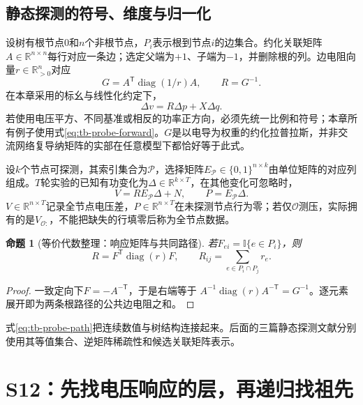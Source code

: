 \documentclass[UTF8,11pt,fontset=fandol,openany,oneside]{ctexbook}
\newtheorem{proposition}[theorem]{命题}
\theoremstyle{definition}
\theoremstyle{remark}
\numberwithin{equation}{chapter}
\begin{document}
\subsection{静态探测的符号、维度与归一化}

设树有根节点0和$n$个非根节点，$P_i$表示根到节点$i$的边集合。约化关联矩阵$A\in\mathbb R^{n\times n}$每行对应一条边；选定父端为$+1$、子端为$-1$，并删除根的列。边电阻向量$r\in\mathbb R^n_{>0}$对应
\[
 G=A^{\mathsf T}\operatorname{diag}(1/r)A,\qquad R=G^{-1}.
\]
在本章采用的标幺与线性化约定下，
\begin{equation}
 \Delta v=R\Delta p+X\Delta q.
 \label{eq:tb-probe-forward}
\end{equation}
若使用电压平方、不同基准或相反的功率正方向，必须先统一比例和符号；本章所有例子使用式\eqref{eq:tb-probe-forward}。$G$是以电导为权重的约化拉普拉斯，并非交流网络复导纳矩阵的实部在任意模型下都恰好等于此式。

设$k$个节点可探测，其索引集合为$\mathcal P$，选择矩阵$E_{\mathcal P}\in\{0,1\}^{n\times k}$由单位矩阵的对应列组成。$T$轮实验的已知有功变化为$\Delta\in\mathbb R^{k\times T}$，在其他变化可忽略时，
\begin{equation}
 V=RE_{\mathcal P}\Delta+N,\qquad P=E_{\mathcal P}\Delta.
 \label{eq:tb-probe-data}
\end{equation}
$V\in\mathbb R^{n\times T}$记录全节点电压差，$P\in\mathbb R^{n\times T}$在未探测节点行为零；若仅$\mathcal O$测压，实际拥有的是$V_{\mathcal O:}$，不能把缺失的行填零后称为全节点数据。

\begin{proposition}[等价代数整理：响应矩阵与共同路径]
若$F_{ei}=\mathbb I\{e\in P_i\}$，则
\begin{equation}
 R=F^{\mathsf T}\operatorname{diag}(r)F,\qquad
 R_{ij}=\sum_{e\in P_i\cap P_j}r_e.
 \label{eq:tb-probe-path}
\end{equation}
\end{proposition}
\begin{proof}
一致定向下$F=-A^{-\mathsf T}$，于是右端等于
$A^{-1}\operatorname{diag}(r)A^{-\mathsf T}=G^{-1}$。逐元素展开即为两条根路径的公共边电阻之和。
\end{proof}
式\eqref{eq:tb-probe-path}把连续数值与树结构连接起来。后面的三篇静态探测文献分别使用其等值集合、逆矩阵稀疏性和候选关联矩阵表示。

\section{S12：先找电压响应的层，再递归找祖先}
\label{sec:tb-S12}
\end{document}
